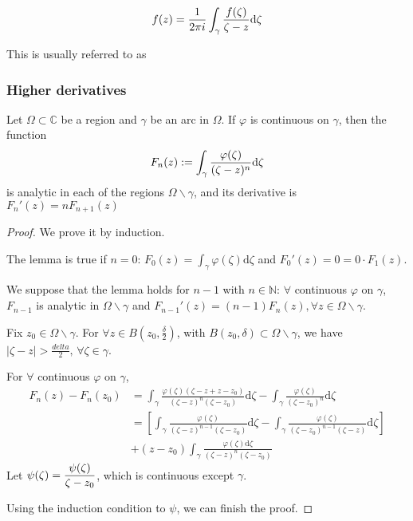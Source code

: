 \[\displaystyle f(z)=\frac{1}{2\pi i}\int_\gamma\frac{f(\zeta)}{\zeta-z}\mathrm{d}\zeta\]

This is usually referred to as 

\subsubsection{Higher derivatives}
\begin{lemma}\label{Lemma of Analytic Properties of integral function}
    Let  $ \Omega\subset\mathbb{C}$ be a region and  $ \gamma $ be an arc in  $ \Omega $. If  $ \varphi $ is continuous on  $ \gamma $, then the function 
    \[F_n(z):=\displaystyle\int_\gamma\frac{\varphi(\zeta)}{(\zeta-z)^n}\mathrm{d}\zeta\]
    is analytic in each of the regions  $ \Omega\backslash \gamma $, and its derivative is  $ F_n'(z)=nF_{n+1}(z) $
\end{lemma}
\begin{proof}
    We prove it by induction. 
    
    The lemma is true if  $ n=0 $:  $ F_0(z)=\int_\gamma\varphi(\zeta)\mathrm{d}\zeta $ and  $ F_0'(z)=0=0\cdot F_1(z) $.
    
    We suppose that the lemma holds for  $ n-1 $ with  $ n\in \mathbb{N} $:  $ \forall  $ continuous $ \varphi $ on  $ \gamma $,  $ F_{n-1} $ is analytic in  $ \Omega\backslash \gamma $ and  $ F_{n-1}'
    (z)=(n-1)F_n(z),\forall z\in \Omega\backslash \gamma $.
    
    Fix  $ z_0\in \Omega\backslash \gamma $. For  $ \forall z\in B(z_0,\frac{\delta}{2}) $, with  $ B(z_0,\delta)\subset \Omega\backslash \gamma $, we have  $ |\zeta-z|>\frac{delta}{2},\,\forall \zeta\in \gamma $.
    
    For  $ \forall  $ continuous  $ \varphi $ on  $ \gamma $,  
    \begin{align*}
        F_n(z)-F_n(z_0)&=\int_\gamma \frac{\varphi(\zeta)(\zeta-z+z-z_0)}{(\zeta-z)^n(\zeta-z_0)} \mathrm{d}\zeta-\int_\gamma\frac{\varphi(\zeta)}{(\zeta-z_0)^n}\mathrm{d}\zeta\\
        &=\left[
        \int_\gamma\frac{\varphi(\zeta)}{(\zeta-z)^{n-1}(\zeta-z_0)}\mathrm{d}\zeta-\int_\gamma\frac{\varphi(\zeta)}{(\zeta-z_0)^{n-1}(\zeta-z)} \mathrm{d}\zeta
    \right]\\
    &+(z-z_0)\int_\gamma\frac{\varphi(\zeta)\mathrm{d}\zeta}{(\zeta-z)^n(\zeta-z_0)}
    \end{align*}   
    Let  $ \psi(\zeta)=\displaystyle\frac{\psi(\zeta)}{\zeta-z_0} $, which is continuous except  $ \gamma $. 
    
    Using the induction condition to  $ \psi $, we can finish the proof. 
\end{proof}